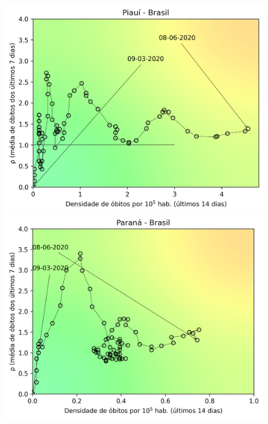 \documentclass[]{article}
\begin{document}
\begin{figure}[!h]
	\centering
	\begin{minipage}[t]{4cm}
		\centering
		\includegraphics[scale=0.5]{../PI.png}
	\end{minipage}
	\hspace{5cm}
	\begin{minipage}[t]{4cm}
		\centering
		\includegraphics[scale=0.5]{../PR.png}
		\vspace{0.2cm}
	\end{minipage}
	

\end{figure}
\end{document}
